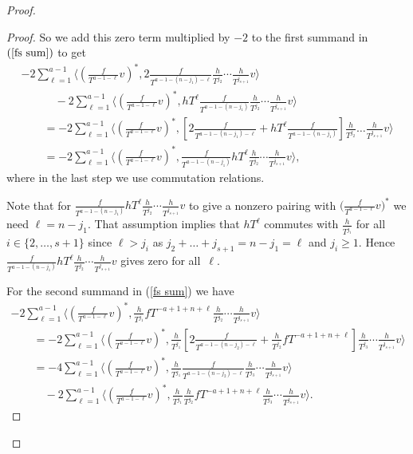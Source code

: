 \documentclass[pdftex]{sigma}
\numberwithin{equation}{section}
\begin{document}
\begin{proof}
\begin{proof}
So we add this zero term multiplied by $-2$ to the first summand in $(\ref{fs sum})$ to get
\begin{gather}
 -2 \sum_{\ell=1}^{a-1} \bigg\langle \left(\frac{f}{T^{a-1-\ell}}v\right)^*, 2\frac{f}{T^{a-1 - (n-j_1) -\ell}}\frac{h}{T^{j_2}}\cdots\frac{h}{T^{j_{s+1}}} v \bigg\rangle \nonumber \\
\qquad\quad{} -2 \sum_{\ell=1}^{a-1} \bigg\langle \left(\frac{f}{T^{a-1-\ell}}v\right)^*, hT^{\ell} \frac{f}{T^{a-1-(n-j_1)}} \frac{h}{T^{j_2}}\cdots\frac{h}{T^{j_{s+1}}} v \bigg\rangle \label{trick_notes} \\
\qquad{} = -2 \sum_{\ell=1}^{a-1} \bigg\langle \left(\frac{f}{T^{a-1-\ell}}v\right)^*, \left[ 2\frac{f}{T^{a-1 - (n-j_1) - \ell}} + hT^{\ell} \frac{f}{T^{a-1-(n-j_1)}} \right] \frac{h}{T^{j_2}}\dots\frac{h}{T^{j_{s+1}}} v \bigg\rangle \nonumber \\
\qquad{} = -2 \sum_{\ell=1}^{a-1} \bigg\langle \left(\frac{f}{T^{a-1-\ell}}v\right)^*, \frac{f}{T^{a-1-(n-j_1)}} hT^{\ell} \frac{h}{T^{j_2}}\cdots\frac{h}{T^{j_{s+1}}} v \bigg\rangle, \nonumber
\end{gather}
where in the last step we use commutation relations.

Note that for $ \frac{f}{T^{a-1-(n-j_1)}} hT^{\ell} \frac{h}{T^{j_2}} \cdots \frac{h}{T^{j_{s+1}}} v $ to give a nonzero pairing with $\big(\frac{f}{T^{a-1-\ell}}v\big)^*$ we need $\ell=n-j_1$. That assumption implies that $hT^{\ell}$ commutes with $\frac{h}{T^{j_i}}$ for all $i \in \{2, \dots, s+1\}$ since $\ell>j_i$ as $j_2+\dots+ j_{s+1} =n - j_1=\ell$ and $j_i \geq 1$. Hence $\frac{f}{T^{a-1-(n-j_1)}} hT^{\ell} \frac{h}{T^{j_2}} \cdots \frac{h}{T^{j_{s+1}}} v $ gives zero for all~$\ell$.

For the second summand in (\ref{fs sum}) we have
\begin{gather}
- 2 \sum_{\ell=1}^{a-1} \bigg\langle \left(\frac{f}{T^{a-1-\ell}}v\right)^*, \frac{h}{T^{j_1}} fT^{-a+1 + n + \ell} \frac{h}{T^{j_2}}\cdots\frac{h}{T^{j_{s+1}}}v \bigg\rangle
\nonumber \\
\qquad{} = - 2 \sum_{\ell=1}^{a-1} \bigg\langle \left(\frac{f}{T^{a-1-\ell}}v\right)^*, \frac{h}{T^{j_1}} \left[ 2 \frac{f}{T^{a-1 - (n-j_2) - \ell}} + \frac{h}{T^{j_2}} fT^{-a+1 + n +\ell} \right] \frac{h}{T^{j_3}} \cdots\frac{h}{T^{j_{s+1}}}v \bigg\rangle \nonumber \\
\qquad{} = - 4 \sum_{\ell=1}^{a-1} \bigg\langle \left(\frac{f}{T^{a-1-\ell}}v\right)^*, \frac{h}{T^{j_1}} \frac{f}{T^{a-1 - (n-j_2) - \ell}} \frac{h}{T^{j_3}} \cdots\frac{h}{T^{j_{s+1}}}v \bigg\rangle \label{ind1} \\
\qquad\quad{} - 2 \sum_{\ell=1}^{a-1} \bigg\langle \left(\frac{f}{T^{a-1-\ell}}v\right)^*, \frac{h}{T^{j_1}} \frac{h}{T^{j_2}} fT^{-a+1 + n +\ell} \frac{h}{T^{j_3}} \cdots\frac{h}{T^{j_{s+1}}}v \bigg\rangle. \label{ind2}
\end{gather}


\end{proof}
\end{proof}
\end{document}
